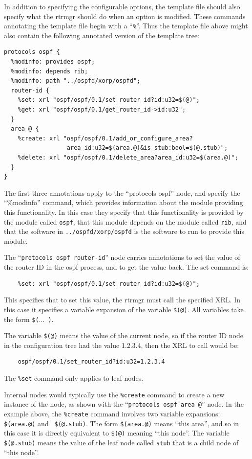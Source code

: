 \documentclass[11pt]{article}
\begin{document}
In addition to specifying the configurable options, the template file
should also specify what the rtrmgr should do when an option is
modified.  These commands annotating the template file begin with a
``{\tt \%}''.  Thus the template file above might also contain the
following annotated version of the template tree:
\begin{verbatim}
protocols ospf {
  %modinfo: provides ospf;
  %modinfo: depends rib;
  %modinfo: path "../ospfd/xorp/ospfd";
  router-id {
    %set: xrl "ospf/ospf/0.1/set_router_id?id:u32=$(@)";
    %get: xrl "ospf/ospf/0.1/get_router_id->id:u32";
  }
  area @ {
    %create: xrl "ospf/ospf/0.1/add_or_configure_area?
                  area_id:u32=$(area.@)&is_stub:bool=$(@.stub)";
    %delete: xrl "ospf/ospf/0.1/delete_area?area_id:u32=$(area.@)";
  }
}
\end{verbatim}
The first three annotations apply to the ``protocols ospf'' node, and
specify the ``\%modinfo'' command, which provides information about
the module providing this functionality.  In this case they specify
that this functionality is provided by the module called {\tt ospf},
that this module depends on the module called {\tt rib}, and that the
software in {\tt ../ospfd/xorp/ospfd} is the software to run to
provide this module.

The ``{\tt protocols ospf router-id}'' node carries annotations to set
the value of the router ID in the ospf process, and to get the value
back.  The set command is:
\begin{verbatim}
    %set: xrl "ospf/ospf/0.1/set_router_id?id:u32=$(@)";
\end{verbatim}
This specifies that to set this value, the rtrmgr must call the
specified XRL.  In this case it specifies a variable expansion of the
variable {\tt \$(@)}.  All variables take the form {\tt \$(}...{\tt
)}.   

The variable {\tt \$(@)} means the value of the
current node, so if the router ID node in the configuration tree had
the value 1.2.3.4, then the XRL to call would be:
\begin{verbatim}
    ospf/ospf/0.1/set_router_id?id:u32=1.2.3.4
\end{verbatim}
The {\tt \%set} command only applies to leaf nodes.  

Internal nodes would typically use the {\tt \%create} command to
create a new instance of the node, as shown with the ``{\tt protocols ospf
area @}'' node.  In the example above, the {\tt \%create} command
involves two variable expansions: {\tt \$(area.@)} and {\tt
\$(@.stub)}.  The form {\tt \$(area.@)} means ``this area'', and so
in this case it is directly equivalent to {\tt \$(@)} meaning ``this node''.
The variable {\tt \$(@.stub)} means the value of the leaf node called
{\tt stub} that is a child node of ``this node''.
\end{document}

